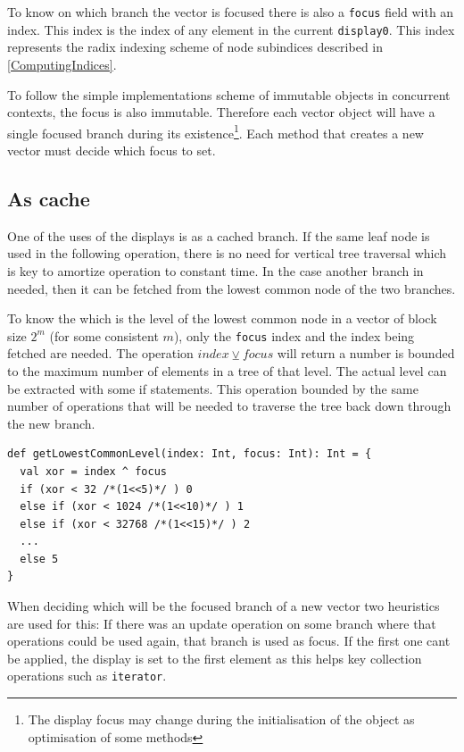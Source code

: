 To know on which branch the vector is focused there is also a \texttt{focus} field with an index. This index is the index of any element in the current \texttt{display0}. This index represents the radix indexing scheme of node subindices described in \ref{ComputingIndices}.

To follow the simple implementations scheme of immutable objects in concurrent contexts, the focus is also immutable. Therefore each vector object will have a single focused branch during its existence\footnote{The display focus may change during the initialisation of the object as optimisation of some methods}. Each method that creates a new vector must decide which focus to set. 


\subsection{As cache}
One of the uses of the displays is as a cached branch. If the same leaf node is used in the following operation, there is no need for vertical tree traversal which is key to amortize operation to constant time. In the case another branch in needed, then it can be fetched from the lowest common node of the two branches. 

To know the which is the level of the lowest common node in a vector of block size $2^m$ (for some consistent $m$), only the \texttt{focus} index and the index being fetched are needed. The operation $index \veebar focus$ will return a number is bounded to the maximum number of elements in a tree of that level. The actual level can be extracted with some if statements. This operation bounded by the same number of operations that will be needed to traverse the tree back down through the new branch.

\begin{lstlisting}[frame=single]
def getLowestCommonLevel(index: Int, focus: Int): Int = {
  val xor = index ^ focus
  if (xor < 32 /*(1<<5)*/ ) 0
  else if (xor < 1024 /*(1<<10)*/ ) 1
  else if (xor < 32768 /*(1<<15)*/ ) 2
  ...
  else 5
}
\end{lstlisting}

When deciding which will be the focused branch of a new vector two heuristics are used for this: If there was an update operation on some branch where that operations could be used again, that branch is used as focus. If the first one cant be applied, the display is set to the first element as this helps key collection operations such as \texttt{iterator}.

